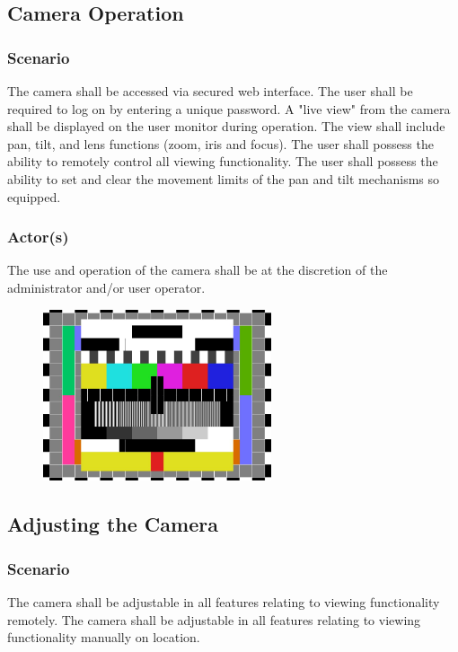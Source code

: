 \subsection{Camera Operation}
\subsubsection{Scenario}
The camera shall be accessed via secured web interface.
The user shall be required to log on by entering a unique password.
A "live view" from the camera shall be displayed on the user monitor during operation. 
The view shall include pan, tilt, and lens functions (zoom, iris and focus). 
The user shall possess the ability to remotely control all viewing functionality.
The user shall possess the ability to set and clear the movement limits of the pan and tilt mechanisms so equipped.
\subsubsection{Actor(s)}
The use and operation of the camera shall be at the discretion of the administrator and/or user operator.
\vspace{0.5 in}
\begin{figure}[h!]
	\centering
   	\includegraphics[width=0.60\textwidth]{images/test_image}
\end{figure}
\vspace{0.5 in}
\subsection{Adjusting the Camera}
\subsubsection{Scenario}
The camera shall be adjustable in all features relating to viewing functionality remotely.
The camera shall be adjustable in all features relating to viewing functionality manually on location.
